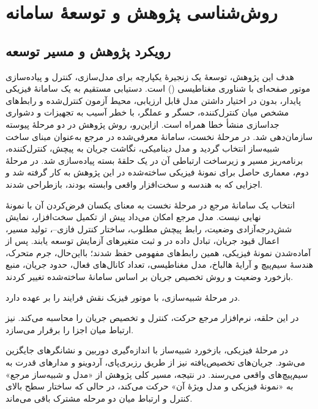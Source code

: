 \chapter{روش‌شناسی پژوهش و توسعهٔ سامانه}
\label{ch:method}

\section{رویکرد پژوهش و مسیر توسعه}
\label{sec:method-research-process}

هدف این پژوهش، توسعهٔ یک زنجیرهٔ یکپارچه برای مدل‌سازی، کنترل و پیاده‌سازی موتور صفحه‌ای با شناوری مغناطیسی () است. دستیابی مستقیم به یک سامانهٔ فیزیکی پایدار، بدون در اختیار داشتن مدل قابل ارزیابی، محیط آزمون کنترل‌شده و رابط‌های مشخص میان کنترل‌کننده، حسگر و عملگر، با خطر آسیب به تجهیزات و دشواری جداسازی منشأ خطا همراه است. ازاین‌رو، روش پژوهش در دو مرحلهٔ پیوسته سازمان‌دهی شد. در مرحلهٔ نخست، سامانهٔ معرفی‌شده در مرجع \cite{xuModularMaglevDesign2024d} به‌عنوان مبنای ساخت شبیه‌ساز انتخاب گردید و مدل دینامیکی، نگاشت جریان به پیچش، کنترل‌کننده، برنامه‌ریز مسیر و زیرساخت ارتباطی آن در یک حلقهٔ بسته پیاده‌سازی شد. در مرحلهٔ دوم، معماری حاصل برای نمونهٔ فیزیکی ساخته‌شده در این پژوهش به کار گرفته شد و اجزایی که به هندسه و سخت‌افزار واقعی وابسته بودند، بازطراحی شدند.

انتخاب یک سامانهٔ مرجع در مرحلهٔ نخست به معنای یکسان فرض‌کردن آن با نمونهٔ نهایی نیست. مدل مرجع امکان می‌داد پیش از تکمیل سخت‌افزار، نمایش شش‌درجه‌آزادی وضعیت، رابط پیچش مطلوب، ساختار کنترل فازی--، تولید مسیر، اعمال قیود جریان، تبادل داده در  و ثبت متغیرهای آزمایش توسعه یابند. پس از آماده‌شدن نمونهٔ فیزیکی، همین رابط‌های مفهومی حفظ شدند؛ بااین‌حال، جرم متحرک، هندسهٔ سیم‌پیچ و آرایهٔ هالباخ، مدل مغناطیسی، تعداد کانال‌های فعال، حدود جریان، منبع بازخورد وضعیت و روش تخصیص جریان بر اساس سامانهٔ ساخته‌شده تغییر کردند.

در مرحلهٔ شبیه‌سازی،  با موتور فیزیک  نقش فرایند را بر عهده دارد.

در این حلقه، نرم‌افزار  مرجع حرکت، کنترل و تخصیص جریان را محاسبه می‌کند.  نیز ارتباط میان اجزا را برقرار می‌سازد.

در مرحلهٔ فیزیکی، بازخورد شبیه‌ساز با اندازه‌گیری دوربین و نشانگرهای  جایگزین می‌شود. جریان‌های تخصیص‌یافته نیز از طریق رزبری‌پای، آردوینو و مدارهای قدرت به سیم‌پیچ‌های واقعی می‌رسند. در نتیجه، مسیر کلی پژوهش از «مدل و شبیه‌ساز مرجع» به «نمونهٔ فیزیکی و مدل ویژهٔ آن» حرکت می‌کند، در حالی که ساختار سطح بالای کنترل و ارتباط میان دو مرحله مشترک باقی می‌ماند.

